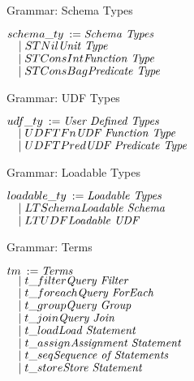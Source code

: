 \begin{frame}{Grammar: Schema Types}
\centering
	\begin{flushleft}
	$ schema\_ty \::= \hfill \textnormal{\emph{Schema Types}}\hfill$\\
	$ \quad \mid STNil\hfill \textnormal{\emph{Unit Type}}\hfill$\\
   	$ \quad \mid STConsInt \hfill \textnormal{\emph{Function Type}}\hfill$\\
     	$ \quad \mid STConsBag \hfill \textnormal{\emph{Predicate Type}}\hfill$\\
	\end{flushleft}
\end{frame}

\begin{frame}{Grammar: UDF Types}
\centering
	\begin{flushleft}
	$ udf\_ty \::= \hfill \textnormal{\emph{User Defined Types}}\hfill$\\
	$ \quad \mid UDFTFn\hfill \textnormal{\emph{UDF Function Type}}\hfill$\\
   	$ \quad \mid UDFTPred \hfill \textnormal{\emph{UDF Predicate Type}}\hfill$\\
	\end{flushleft}
\end{frame}

\begin{frame}{Grammar: Loadable Types}
\centering
	\begin{flushleft}
	$ loadable\_ty \::= \hfill \textnormal{\emph{Loadable Types}}\hfill$\\
	$ \quad \mid LTSchema\hfill \textnormal{\emph{Loadable Schema}}\hfill$\\
   	$ \quad \mid LTUDF \hfill \textnormal{\emph{Loadable UDF}}\hfill$\\
	\end{flushleft}
\end{frame}

\begin{frame}{Grammar: Terms}
\centering
	\begin{flushleft}
	$ tm \::= \hfill \textnormal{\emph{Terms}}\hfill$\\
	$ \quad \mid t\_filter\hfill \textnormal{\emph{Query Filter}}\hfill$\\
   	$ \quad \mid t\_foreach \hfill \textnormal{\emph{Query ForEach}}\hfill$\\
     	$ \quad \mid t\_group \hfill \textnormal{\emph{Query Group}}\hfill$\\
     	$ \quad \mid t\_join \hfill \textnormal{\emph{Query Join}}\hfill$\\
     	$ \quad \mid t\_load \hfill \textnormal{\emph{Load Statement}}\hfill$\\
   	$ \quad \mid t\_assign \hfill \textnormal{\emph{Assignment Statement}}\hfill$\\
     	$ \quad \mid t\_seq \hfill \textnormal{\emph{Sequence of Statements}}\hfill$\\
     	$ \quad \mid t\_store \hfill \textnormal{\emph{Store Statement}}\hfill$\\
	\end{flushleft}
\end{frame}

